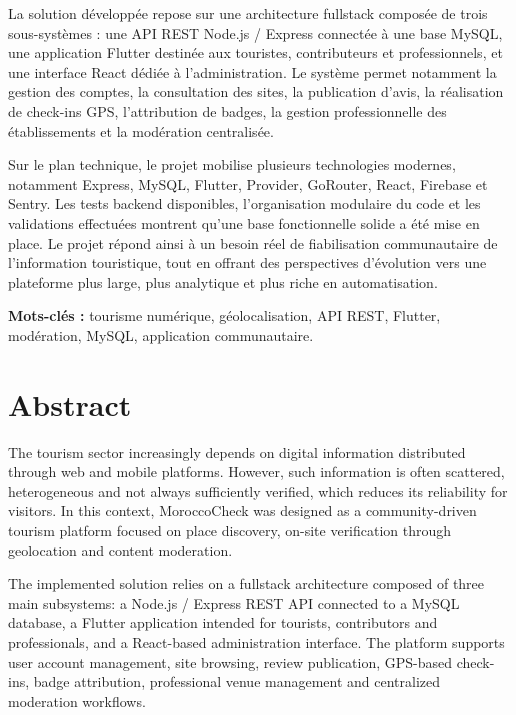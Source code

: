 ﻿\documentclass[12pt,a4paper]{report}
\begin{document}
La solution d\'evelopp\'ee repose sur une architecture fullstack compos\'ee de trois sous-syst\`emes : une API REST Node.js / Express connect\'ee \`a une base MySQL, une application Flutter destin\'ee aux touristes, contributeurs et professionnels, et une interface React d\'edi\'ee \`a l'administration. Le syst\`eme permet notamment la gestion des comptes, la consultation des sites, la publication d'avis, la r\'ealisation de check-ins GPS, l'attribution de badges, la gestion professionnelle des \'etablissements et la mod\'eration centralis\'ee.

Sur le plan technique, le projet mobilise plusieurs technologies modernes, notamment Express, MySQL, Flutter, Provider, GoRouter, React, Firebase et Sentry. Les tests backend disponibles, l'organisation modulaire du code et les validations effectu\'ees montrent qu'une base fonctionnelle solide a \'et\'e mise en place. Le projet r\'epond ainsi \`a un besoin r\'eel de fiabilisation communautaire de l'information touristique, tout en offrant des perspectives d'\'evolution vers une plateforme plus large, plus analytique et plus riche en automatisation.

\noindent\textbf{Mots-cl\'es :} tourisme num\'erique, g\'eolocalisation, API REST, Flutter, mod\'eration, MySQL, application communautaire.

\clearpage
\chapter*{Abstract}
The tourism sector increasingly depends on digital information distributed through web and mobile platforms. However, such information is often scattered, heterogeneous and not always sufficiently verified, which reduces its reliability for visitors. In this context, MoroccoCheck was designed as a community-driven tourism platform focused on place discovery, on-site verification through geolocation and content moderation.

The implemented solution relies on a fullstack architecture composed of three main subsystems: a Node.js / Express REST API connected to a MySQL database, a Flutter application intended for tourists, contributors and professionals, and a React-based administration interface. The platform supports user account management, site browsing, review publication, GPS-based check-ins, badge attribution, professional venue management and centralized moderation workflows.
\end{document}

